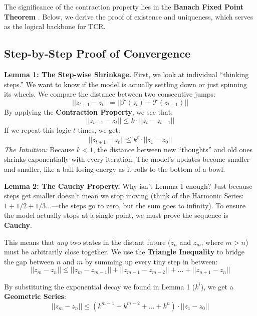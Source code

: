 \documentclass[11pt, a4paper]{article}
\begin{document}
The significance of the contraction property lies in the \textbf{Banach Fixed Point Theorem} \cite{banach1922operations}. Below, we derive the proof of existence and uniqueness, which serves as the logical backbone for TCR.

\subsection{Step-by-Step Proof of Convergence}

\textbf{Lemma 1: The Step-wise Shrinkage.}
First, we look at individual ``thinking steps.'' We want to know if the model is actually settling down or just spinning its wheels. We compare the distance between two consecutive jumps:
\begin{equation}
 ||z_{t+1} - z_t|| = ||\mathcal{T}(z_t) - \mathcal{T}(z_{t-1})|| 
\end{equation}
By applying the \textbf{Contraction Property}, we see that:
\begin{equation}
 ||z_{t+1} - z_t|| \le k \cdot ||z_t - z_{t-1}|| 
\end{equation}
If we repeat this logic $t$ times, we get:
\begin{equation}
 ||z_{t+1} - z_t|| \le k^t \cdot ||z_1 - z_0|| 
\end{equation}
\textit{The Intuition:} Because $k < 1$, the distance between new ``thoughts'' and old ones shrinks exponentially with every iteration. The model's updates become smaller and smaller, like a ball losing energy as it rolls to the bottom of a bowl.

\textbf{Lemma 2: The Cauchy Property.}
Why isn't Lemma 1 enough? Just because steps get smaller doesn't mean we stop moving (think of the Harmonic Series: $1 + 1/2 + 1/3 \dots$---the steps go to zero, but the sum goes to infinity). To ensure the model actually stops at a single point, we must prove the sequence is \textbf{Cauchy}. 

This means that \textit{any} two states in the distant future ($z_n$ and $z_m$, where $m > n$) must be arbitrarily close together. We use the \textbf{Triangle Inequality} to bridge the gap between $n$ and $m$ by summing up every tiny step in between:
\begin{equation}
 ||z_m - z_n|| \le ||z_m - z_{m-1}|| + ||z_{m-1} - z_{m-2}|| + \dots + ||z_{n+1} - z_n|| 
\end{equation}

By substituting the exponential decay we found in Lemma 1 ($k^i$), we get a \textbf{Geometric Series}:
\begin{equation}
 ||z_m - z_n|| \le (k^{m-1} + k^{m-2} + \dots + k^n) \cdot ||z_1 - z_0|| 
\end{equation}
\end{document}
